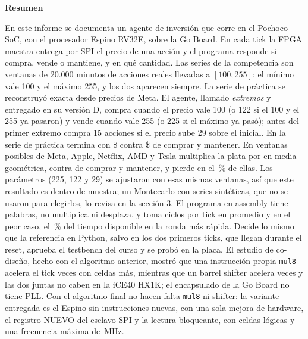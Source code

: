 \documentclass[11pt,letterpaper]{article}
\begin{document}
\begin{center}\textbf{Resumen}\end{center}
\vspace{2pt}
En este informe se documenta un agente de inversión que corre en el Pochoco SoC, con el procesador
Espino RV32E, sobre la Go Board. En cada tick la FPGA maestra entrega por SPI el precio de una acción
y el programa responde si compra, vende o mantiene, y en qué cantidad. Las series de la competencia son
ventanas de 20.000 minutos de acciones reales llevadas a $[100, 255]$: el mínimo vale 100 y el máximo
255, y los dos aparecen siempre. La serie de práctica se reconstruyó exacta desde precios de Meta. El
agente, llamado \emph{extremos} y entregado en su versión D, compra cuando el precio vale 100 (o 122
si el 100 y el 255 ya pasaron) y vende cuando vale 255 (o 225 si el máximo ya pasó); antes del primer
extremo compra 15 acciones si el precio sube 29 sobre el inicial. En la serie de práctica termina con
\$\MetaW{} contra \$\MetaCym{} de comprar y mantener. En \NVentanas{} ventanas posibles de Meta, Apple,
Netflix, AMD y Tesla multiplica la plata por \ExtGeo{} en media geométrica, contra \CymGeo{} de comprar
y mantener, y pierde en el \ExtPierde\,\% de ellas. Los parámetros (225, 122 y 29) se ajustaron con esas
mismas ventanas, así que este resultado es dentro de muestra; un Montecarlo con series sintéticas, que no se
usaron para elegirlos, lo revisa en la sección 3. El programa en assembly tiene \ExtPalabras{}
palabras, no multiplica ni desplaza, y toma \ExtCiclosProm{} ciclos por tick en promedio y
\ExtCiclosPeor{} en el peor caso, el \ExtPctRtres\,\% del tiempo disponible en la ronda más rápida.
Decide lo mismo que la referencia en Python, salvo en los dos primeros ticks, que llegan durante el reset, aprueba el testbench del curso y se probó en la placa. El
estudio de co-diseño, hecho con el algoritmo anterior, mostró que una instrucción propia \texttt{mul8}
acelera el tick \SpeedupMul{} veces con \CostoMul{} celdas más, mientras que un barrel shifter acelera
\SpeedupShift{} veces y las dos juntas no caben en la iCE40 HX1K; el encapsulado de la Go Board no tiene PLL.
Con el algoritmo final no hacen falta \texttt{mul8} ni shifter: la variante entregada es el Espino sin
instrucciones nuevas, con una sola mejora de hardware, el registro NUEVO del esclavo SPI y la lectura
bloqueante, con \LCSw{} celdas lógicas y una frecuencia máxima de \FmaxSw\,MHz.
\end{document}
